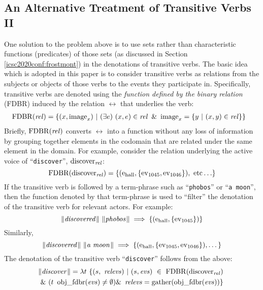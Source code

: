 \documentclass[../main.tex]{subfiles}
\begin{document}
\begin{refsection}
\subsection{An Alternative Treatment of Transitive Verbs II}
\label{icsc2020conf:altvbii}


One solution to the problem above is to use sets rather than characteristic functions (predicates) of those sets (as discussed in Section \ref{icsc2020conf:frostmont}) in the denotations of transitive verbs. The basic idea \cite{frost1989constructing} which is adopted in this paper is to consider transitive verbs as relations from the subjects or objects of those verbs to the events they participate in.
Specifically, transitive verbs are denoted using the {\em function defined by the binary relation} (FDBR) \cite{peelar2016accommodating} induced by the relation $\rel$ that underlies the verb:
\begin{equation*}
	\begin{split}
		&\operatorname{FDBR}({\operatorname{\mathit{rel}}}) = \{(x, \operatorname{image}_x)\ | \ (\exists e)\ (x, e) \in \operatorname{\mathit{rel}}\ \& \ \operatorname{image}_x = \{ y\ |\ (x, y) \in \operatorname{\mathit{rel}} \}  \}
	\end{split}
\end{equation*}
Briefly, $\operatorname{FDBR}({\operatorname{\mathit{rel}}})$ converts $\rel$ into a function without any loss of information by grouping together elements in the codomain that are related under the same element in the domain. For example, consider the relation underlying the active voice of ``\texttt{discover}'', $\operatorname{discover}_{\operatorname{\mathit{rel}}}$:
\[ \FDBR{\relation{discover}} = \{(\entityassoc{\hall}, \{ \eventassoc{1045}, \eventassoc{1046} \} ),\ \dmathrm{etc} \ldots \} \]
If the transitive verb is followed by a term-phrase such as ``\texttt{phobos}'' or ``\texttt{a moon}'', then
the function denoted by that term-phrase is used to ``filter'' the denotation of the transitive verb for relevant actors. For example:
\[ \lVert\textit{discovered\hspace{0.1em}}\rVert \ \lVert\textit{phobos\hspace{0.1em}}\rVert \implies \{ (\mathrm{e}_{\operatorname{\operatorname{hall}}}, \{ \operatorname{ev}_{1045} \} ) \} \]
Similarly,
\[\meaningof{discovered} \ \meaningof{a\ moon} \implies \{ (\entityassoc{\hall}, \{ \eventassoc{1045}, \eventassoc{1046} \} ), \dots \} \]
\noindent The denotation of the transitive verb ``\texttt{discover}'' follows from the above:
\begin{multline*}
	\meaningof{discover} =
	\lambda t\ \{ (s,\ \opit{relevs})\ |\ (s, \evs)\ \in\ \FDBR{\relation{discover}}\  \\
	\&\ (t\ \objfdbr{\evs} \neq \emptyset)
	\&\ \opit{relevs} = \gatherevs{\objfdbr{\evs}} \}

\end{multline*}
\end{refsection}
\end{document}
